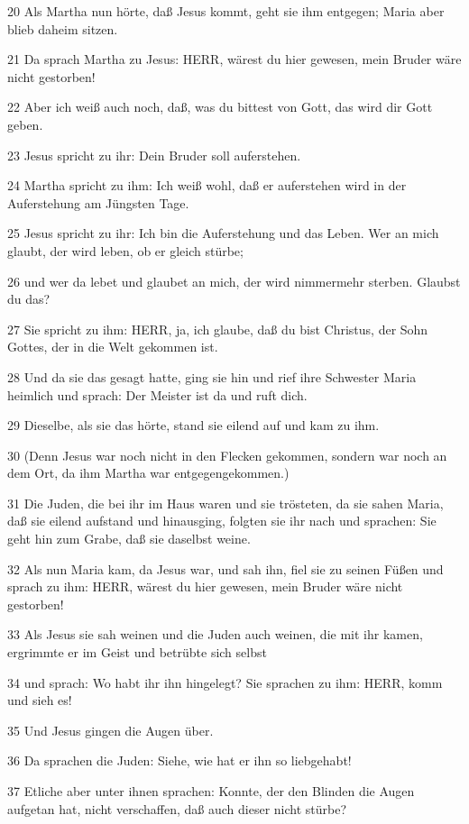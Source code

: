 \par 20 Als Martha nun hörte, daß Jesus kommt, geht sie ihm entgegen; Maria aber blieb daheim sitzen.
\par 21 Da sprach Martha zu Jesus: HERR, wärest du hier gewesen, mein Bruder wäre nicht gestorben!
\par 22 Aber ich weiß auch noch, daß, was du bittest von Gott, das wird dir Gott geben.
\par 23 Jesus spricht zu ihr: Dein Bruder soll auferstehen.
\par 24 Martha spricht zu ihm: Ich weiß wohl, daß er auferstehen wird in der Auferstehung am Jüngsten Tage.
\par 25 Jesus spricht zu ihr: Ich bin die Auferstehung und das Leben. Wer an mich glaubt, der wird leben, ob er gleich stürbe;
\par 26 und wer da lebet und glaubet an mich, der wird nimmermehr sterben. Glaubst du das?
\par 27 Sie spricht zu ihm: HERR, ja, ich glaube, daß du bist Christus, der Sohn Gottes, der in die Welt gekommen ist.
\par 28 Und da sie das gesagt hatte, ging sie hin und rief ihre Schwester Maria heimlich und sprach: Der Meister ist da und ruft dich.
\par 29 Dieselbe, als sie das hörte, stand sie eilend auf und kam zu ihm.
\par 30 (Denn Jesus war noch nicht in den Flecken gekommen, sondern war noch an dem Ort, da ihm Martha war entgegengekommen.)
\par 31 Die Juden, die bei ihr im Haus waren und sie trösteten, da sie sahen Maria, daß sie eilend aufstand und hinausging, folgten sie ihr nach und sprachen: Sie geht hin zum Grabe, daß sie daselbst weine.
\par 32 Als nun Maria kam, da Jesus war, und sah ihn, fiel sie zu seinen Füßen und sprach zu ihm: HERR, wärest du hier gewesen, mein Bruder wäre nicht gestorben!
\par 33 Als Jesus sie sah weinen und die Juden auch weinen, die mit ihr kamen, ergrimmte er im Geist und betrübte sich selbst
\par 34 und sprach: Wo habt ihr ihn hingelegt? Sie sprachen zu ihm: HERR, komm und sieh es!
\par 35 Und Jesus gingen die Augen über.
\par 36 Da sprachen die Juden: Siehe, wie hat er ihn so liebgehabt!
\par 37 Etliche aber unter ihnen sprachen: Konnte, der den Blinden die Augen aufgetan hat, nicht verschaffen, daß auch dieser nicht stürbe?

